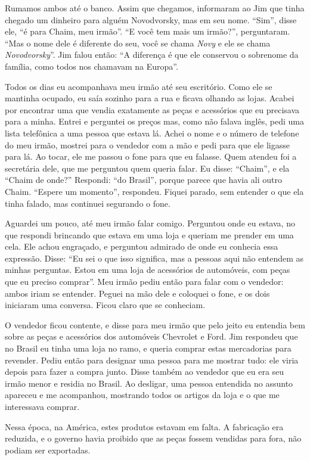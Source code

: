 Rumamos ambos até o banco. Assim que chegamos, informaram ao Jim que tinha
chegado um dinheiro para alguém Novodvorsky, mas em seu nome. ``Sim'',
disse ele, ``é para Chaim, meu irmão''. ``E você tem mais um
irmão?'', perguntaram. ``Mas o nome dele é diferente do seu, você se
chama \textit{Novy} e ele se chama \textit{Novodvorsky}''. Jim falou então: ``A diferença é
que ele conservou o sobrenome da família, como todos nos chamavam na
Europa''.

Todos os dias eu acompanhava meu irmão até seu escritório. Como ele
se mantinha ocupado, eu saía sozinho para a rua e ficava
olhando as lojas. Acabei por encontrar uma que vendia exatamente as peças e
acessórios que eu precisava para a minha. Entrei e perguntei
os preços mas, como não falava inglês, pedi uma lista telefônica a uma
pessoa que estava lá. Achei o nome e o número de telefone do meu irmão,
mostrei para o vendedor com a mão e pedi para que ele ligasse para lá.
Ao tocar, ele me passou o fone para que eu falasse. Quem
atendeu foi a secretária dele, que me perguntou quem queria
falar. Eu disse: ``Chaim'', e ela ``Chaim de onde?'' Respondi: ``do Brasil'', porque
parece que havia ali outro Chaim. ``Espere um momento'', respondeu. Fiquei
parado, sem entender o que ela tinha falado, mas
continuei segurando o fone.

Aguardei um pouco, até meu irmão falar comigo. Perguntou
onde eu estava, no que respondi brincando que estava em uma loja e queriam me
prender em uma cela. Ele achou engraçado, e perguntou admirado de onde eu
conhecia essa expressão. Disse: ``Eu sei o que isso significa, mas a
pessoas aqui não entendem as minhas perguntas. Estou em uma loja de
acessórios de automóveis, com peças que eu preciso comprar''. 
Meu irmão pediu então para falar com o vendedor: ambos iriam se entender. 
Peguei na mão dele e coloquei o fone, e os
dois iniciaram uma conversa. Ficou claro que se conheciam.

O vendedor ficou contente, e disse para meu irmão que pelo jeito
eu entendia bem sobre as peças e acessórios dos automóveis Chevrolet e
Ford. Jim respondeu que no Brasil eu tinha uma loja no ramo, e queria
comprar estas mercadorias para revender. Pediu então para designar uma pessoa
para me mostrar tudo: ele viria depois para fazer a compra junto.
Disse também ao vendedor que eu era seu irmão menor e residia no Brasil.
Ao desligar, uma pessoa entendida no assunto apareceu e me acompanhou, mostrando todos os
artigos da loja e o que me interessava comprar.

Nessa época, na América, estes produtos estavam em falta. A fabricação era
reduzida, e o governo havia proibido que as peças fossem vendidas para
fora, não podiam ser exportadas.


